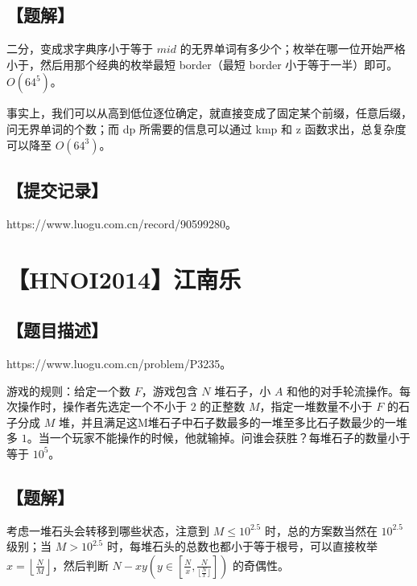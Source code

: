 \documentclass[UTF8,12pt,a4paper]{ctexart}
\begin{document}
	\subsection*{【题解】}
	
	二分，变成求字典序小于等于 $mid$ 的无界单词有多少个；枚举在哪一位开始严格小于，然后用那个经典的枚举最短 border（最短 border 小于等于一半）即可。$O(64^5)$。
	
	事实上，我们可以从高到低位逐位确定，就直接变成了固定某个前缀，任意后缀，问无界单词的个数；而 dp 所需要的信息可以通过 kmp 和 z 函数求出，总复杂度可以降至 $O(64^3)$。
	
	\subsection*{【提交记录】}
	
	https://www.luogu.com.cn/record/90599280。
	
	
	\section*{【HNOI2014】江南乐}
	
	\subsection*{【题目描述】}
	
	https://www.luogu.com.cn/problem/P3235。
	
	游戏的规则：给定一个数 $F$，游戏包含 $N$ 堆石子，小 $A$ 和他的对手轮流操作。每次操作时，操作者先选定一个不小于 $2$ 的正整数 $M$，指定一堆数量不小于 $F$ 的石子分成 $M$ 堆，并且满足这M堆石子中石子数最多的一堆至多比石子数最少的一堆多 $1$。当一个玩家不能操作的时候，他就输掉。问谁会获胜？每堆石子的数量小于等于 $10^5$。
	
	\subsection*{【题解】}
	
	考虑一堆石头会转移到哪些状态，注意到 $M\le 10^{2.5}$ 时，总的方案数当然在 $10^{2.5}$ 级别；当 $M> 10^{2.5}$ 时，每堆石头的总数也都小于等于根号，可以直接枚举 $x=\left\lfloor\frac NM\right\rfloor$，然后判断 $N-xy\left(y\in\left[\frac Nx, \frac{N}{\lfloor\frac Nx\rfloor}\right]\right)$ 的奇偶性。
	
\end{document}
